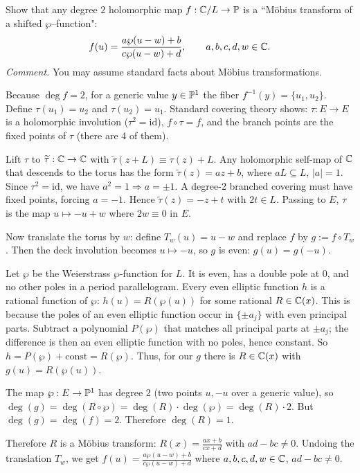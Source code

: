 \documentclass[12pt]{article}  %
\begin{document}
\begin{problem}[3 (from RS2)]
Show that any degree $2$ holomorphic map $f:\C/L \to \P$ is a “M{\"o}bius transform of a shifted $\wp$–function":
\[
  f(u) = \frac{a\wp(u-w)+b}{c\wp(u-w)+d}, \qquad a,b,c,d,w \in \C.
\]
\emph{Comment.} You may assume standard facts about M{\"o}bius transformations.
\end{problem}

\begin{solution}
  Because $\deg f=2$, for a generic value $y\in\P^1$ the fiber $f^{-1}(y)=\{u_1,u_2\}$. Define $\tau(u_1)=u_2$ and $\tau(u_2)=u_1$. Standard covering theory shows: $\tau:E\to E$ is a holomorphic involution ($\tau^2=\mathrm{id}$), $f\circ\tau=f$, and the branch points are the fixed points of $\tau$ (there are 4 of them).

  Lift $\tau$ to $\widetilde\tau:\C\to\C$ with $\widetilde\tau(z+L)\equiv\tau(z)+L$. Any holomorphic self-map of $\C$ that descends to the torus has the form $\widetilde\tau(z)=az+b$, where $aL\subseteq L$, $|a|=1$. Since $\tau^2=\mathrm{id}$, we have $a^2=1\Rightarrow a=\pm1$. A degree-2 branched covering must have fixed points, forcing $a=-1$. Hence $\widetilde\tau(z)=-z+t$ with $2t\in L$. Passing to $E$, $\tau$ is the map $u\mapsto -u+w$ where $2w\equiv0$ in $E$.

  Now translate the torus by $w$: define $T_w(u)=u-w$ and replace $f$ by $g:=f\circ T_w$. Then the deck involution becomes $u\mapsto -u$, so $g$ is even: $g(u)=g(-u)$.

  Let $\wp$ be the Weierstrass $\wp$-function for $L$. It is even, has a double pole at 0, and no other poles in a period parallelogram. Every even elliptic function $h$ is a rational function of $\wp$: $h(u)=R(\wp(u))$ for some rational $R\in\C(x)$. This is because the poles of an even elliptic function occur in $\{\pm a_j\}$ with even principal parts. Subtract a polynomial $P(\wp)$ that matches all principal parts at $\pm a_j$; the difference is then an even elliptic function with no poles, hence constant. So $h=P(\wp)+\text{const}=R(\wp)$. Thus, for our $g$ there is $R\in\C(x)$ with $g(u)=R(\wp(u))$.

  The map $\wp:E\to\P^1$ has degree 2 (two points $u,-u$ over a generic value), so $\deg(g)=\deg(R\circ\wp)=\deg(R)\cdot \deg(\wp)=\deg(R)\cdot 2$. But $\deg(g)=\deg(f)=2$. Therefore $\deg(R)=1$.
  
  Therefore $R$ is a Möbius transform: $R(x)=\frac{ax+b}{cx+d}$ with $ad-bc\neq0$. Undoing the translation $T_w$, we get $f(u)=\frac{a\wp(u-w)+b}{c\wp(u-w)+d}$ where $a,b,c,d,w\in\C$, $ad-bc\neq0$.
\end{solution}
\end{document}
